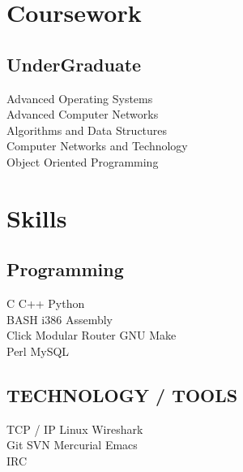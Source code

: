 \documentclass[letterpaper]{deedy-resume} %
\begin{document}
\begin{minipage}[t]{0.33\textwidth}
\section{Coursework}
\subsection{UnderGraduate}
Advanced Operating Systems \\
Advanced Computer Networks \\
Algorithms and Data Structures \\
Computer Networks and Technology \\
Object Oriented Programming \\
\sectionspace %
\section{Skills}
\subsection{Programming}
C \textbullet{} C++ \textbullet{} Python \\
BASH \textbullet{} i386 Assembly \\
Click Modular Router  \textbullet{} GNU Make \\
Perl \textbullet{} MySQL
\sectionspace %
\subsection{TECHNOLOGY / TOOLS}
TCP / IP \textbullet{} Linux \textbullet{} Wireshark \\
Git \textbullet{} SVN \textbullet{} Mercurial \textbullet{}  Emacs \\
IRC
\end{minipage} %
\hfill
%
%
\end{document}

